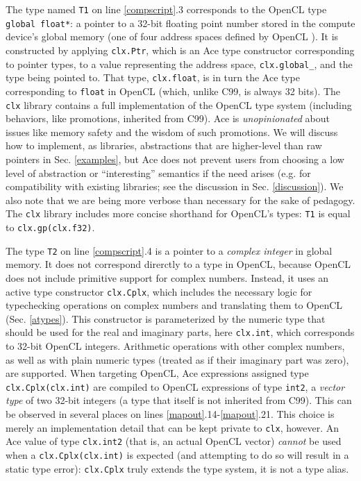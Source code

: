\documentclass[9pt,preprint]{sigplanconf}
\begin{document}
The type named \verb|T1| on line \ref{compscript}.3 corresponds to the OpenCL type \verb|global float*|: a pointer to a 32-bit floating point number stored in the compute device's global memory (one of four address spaces defined by OpenCL \cite{opencl11}). It is constructed by applying \verb|clx.Ptr|, which is an Ace type constructor corresponding to pointer types, to a value representing the  address space, \verb|clx.global_|, and the type being pointed to. That type, \verb|clx.float|, is in turn the Ace type corresponding to \verb|float| in OpenCL (which, unlike C99, is always 32 bits). 
The \verb|clx| library contains a full implementation of the OpenCL type system (including behaviors, like promotions, inherited from C99).
Ace is \emph{unopinionated} about issues like memory safety and the wisdom of such promotions. We will discuss how to implement, as libraries, abstractions that are higher-level than raw pointers in Sec. \ref{examples}, but Ace does not prevent users from choosing a low level of abstraction or ``interesting'' semantics if the need arises (e.g. for compatibility with existing libraries; see the discussion in Sec. \ref{discussion}). We also note that we are being more verbose than necessary for the sake of pedagogy. The \verb|clx| library includes more concise shorthand for OpenCL's types: \verb|T1| is equal to \verb|clx.gp(clx.f32)|. %

The type \verb|T2| on line \ref{compscript}.4 is a pointer to a \emph{complex integer} in global memory. It does not correspond direrctly to a type in OpenCL, because OpenCL does not include primitive support for complex numbers. Instead, it uses an active type constructor \verb|clx.Cplx|, which includes the necessary logic for typechecking operations on complex numbers and translating them to OpenCL (Sec. \ref{atypes}). This constructor is parameterized by the numeric type that should be used for the real and imaginary parts, here \verb|clx.int|, which corresponds to 32-bit OpenCL integers. Arithmetic operations with other complex numbers, as well as with plain numeric types (treated as if their imaginary part was zero), are supported. When targeting OpenCL, Ace expressions assigned type \verb|clx.Cplx(clx.int)| are compiled to OpenCL expressions of type \verb|int2|, a  \emph{vector type} of two 32-bit integers (a type that itself is not inherited from C99). This can be observed in several places on lines \ref{mapout}.14-\ref{mapout}.21. This choice is merely an implementation detail that can be kept private to \verb|clx|, however. An Ace value of type \verb|clx.int2| (that is, an actual OpenCL vector) \emph{cannot} be used when a \verb|clx.Cplx(clx.int)| is expected (and attempting to do so will result in a static type error): \verb|clx.Cplx| truly extends the type system, it is not a type alias.
\end{document}
